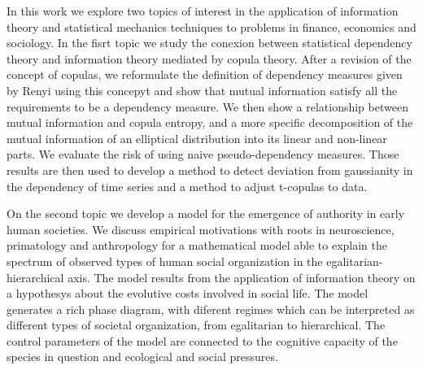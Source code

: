 In this work we explore two topics of interest in the application of information theory and statistical mechanics techniques to problems in finance, economics and sociology. In the fisrt topic we study the conexion between statistical dependency theory and information theory mediated by copula theory. After a revision of the concept of copulas, we reformulate the definition of dependency measures given by Renyi \cite{Renyi1959} using this concepyt and show that mutual information satisfy all the requirements to be a dependency measure. We then show a relationship between mutual information and copula entropy, and a more specific decomposition of the mutual information of an elliptical distribution into its linear and non-linear parts. We evaluate the risk of using naive pseudo-dependency measures. Those results are then used to develop a method to detect deviation from gaussianity in the dependency of time series and a method to adjust t-copulas to data\cite{Calsaverini2009}.

On the second topic we develop a model for the emergence of authority in early human societies. We discuss empirical motivations with roots in neuroscience, primatology and anthropology for a mathematical model able to explain the spectrum of observed types of human social organization in the egalitarian-hierarchical axis. The model results from the application of information theory on a hypothesys about the evolutive costs involved in social life. The model generates a rich phase diagram, with diferent regimes which can be interpreted as different types of societal organization, from egalitarian to hierarchical. The control parameters of the model are connected to the cognitive capacity of the species in question and ecological 	and social pressures.